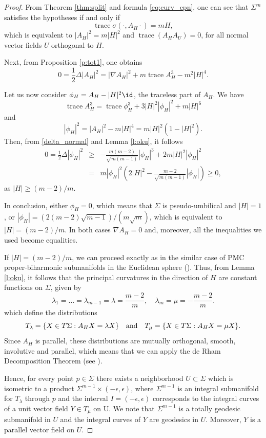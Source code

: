 \documentclass[11pt]{amsart}
\theoremstyle{plain}
\theoremstyle{definition}
\DeclareMathOperator{\trace}{trace} \DeclareMathOperator{\di}{div}
\numberwithin{equation}{section}
\begin{document}
\begin{proof} From Theorem \ref{thm:split} and formula \eqref{eq:curv_cpn}, one can see that $\Sigma^m$ satisfies the hypotheses if and only if
\begin{equation*}
\trace\sigma(\cdot,A_H\cdot)=mH,
\end{equation*} 
which is equivalent to $|A_H|^2=m|H|^2$ and $\trace(A_HA_U)=0$, for all normal vector fields $U$ orthogonal to $H$.

Next, from Proposition \ref{p:tot1}, one obtains
\begin{equation}\label{delta_normal}
0=\frac{1}{2}\Delta|A_H|^2=|\nabla A_H|^2+m\trace A_H^3-m^2|H|^4.
\end{equation}

Let us now consider $\phi_H=A_H-|H|^2\id$, the traceless part of $A_H$. We have
\begin{equation*}
\trace A_H^3=\trace\phi_H^3+3|H|^2|\phi_H|^2+m|H|^6
\end{equation*}
and
\begin{equation*}
|\phi_H|^2=|A_H|^2-m|H|^4=m|H|^2(1-|H|^2).
\end{equation*}
Then, from \eqref{delta_normal} and Lemma \ref{l:oku}, it follows
\begin{eqnarray*}
0=\frac{1}{2}\Delta|\phi_H|^2&\geq&-\frac{m(m-2)}{\sqrt{m(m-1)}}|\phi_H|^3+2m|H|^2|\phi_H|^2\\&=&m|\phi_H|^2\left(2|H|^2-\frac{m-2}{\sqrt{m(m-1)}}|\phi_H|\right)\geq 0,
\end{eqnarray*}
as $|H|\geq(m-2)/m$.

In conclusion, either $\phi_H=0$, which means that $\Sigma$ is pseudo-umbilical and $|H|=1$, or $|\phi_H|=(2(m-2)\sqrt{m-1})/(m\sqrt{m})$, which is equivalent to $|H|=(m-2)/m$. In both cases $\nabla A_H=0$ and, moreover, all the inequalities we used become equalities.

If $|H|=(m-2)/m$, we can proceed exactly as in the similar case of PMC proper-biharmonic submanifolds in the Euclidean sphere (\cite[Theorem~3.11]{BO}). Thus, from Lemma \ref{l:oku}, it follows that the principal curvatures in the direction of $H$ are constant functions on $\Sigma$, given by
$$
\lambda_1=\ldots=\lambda_{m-1}=\lambda=\frac{m-2}{m},\quad\lambda_m=\mu=-\frac{m-2}{m}.
$$
which define the distributions
$$
T_{\lambda}=\{X\in T\Sigma: A_HX = \lambda X\}\quad\textnormal{and}\quad T_{\mu}=\{X\in T\Sigma: A_HX=\mu X\}.
$$
Since $A_H$ is parallel, these distributions are mutually orthogonal, smooth, involutive and parallel, which means that we can apply the de
Rham Decomposition Theorem (see \cite{dR}).

Hence, for every point $p\in\Sigma$ there exists a neighborhood $U\subset\Sigma$ which is isometric to a product $\Sigma^{m-1}\times (-\epsilon,\epsilon)$, where
$\Sigma^{m-1}$ is an integral submanifold for $T_{\lambda}$ through $p$ and the interval $I=(-\epsilon,\epsilon)$ corresponds to the integral curves of a unit vector field $Y\in T_{\mu}$ on U. We note that $\Sigma^{m-1}$ is a totally geodesic submanifold in $U$ and the integral curves of $Y$ are geodesics in $U$. Moreover, $Y$ is a parallel vector field on $U$.
\end{proof}
\end{document}
